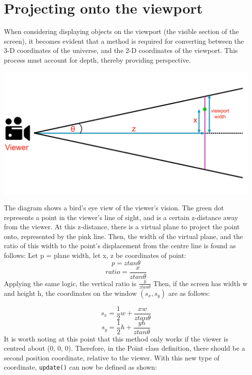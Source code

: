 \documentclass{article}
\begin{document}
\section{Projecting onto the viewport}
When considering displaying objects on the viewport (the visible section of the screen), it becomes evident that a method is required for converting between the 3-D coordinates of the universe, and the 2-D coordinates of the viewport. This process must account for depth, thereby providing perspective.

\includegraphics[width=1\textwidth]{projection_diagram.png}

The diagram shows a bird's eye view of the viewer's vision. The green dot represents a point in the viewer's line of sight, and is a certain z-distance away from the viewer. At this z-distance, there is a virtual plane to project the point onto, represented by the pink line. 
\newline
\newline
Then, the width of the virtual plane, and the ratio of this width to the point's displacement from the centre line is found as follows:
\newline
\newline
Let p = plane width, let x, z be coordinates of point:
$$ p = ztan{\theta} $$
$$ ratio = \frac{x}{ztan{\theta}} $$
Applying the same logic, the vertical ratio is $ \frac{y}{ztan{\theta}} $
\newline
\newline
Then, if the screen has width w and height h, the coordinates on the window $(s_x, s_y) $ are as follows:

$$ s_x = \frac{1}{2}w + \frac{xw}{ztan{\theta}} $$
$$ s_y = \frac{1}{2}h + \frac{yh}{ztan{\theta}} $$
\newpage
It is worth noting at this point that this method only works if the viewer is centred about (0, 0, 0). Therefore, in the Point class definition, there should be a second position coordinate, relative to the viewer. With this new type of coordinate, \verb|update()| can now be defined as shown:
\end{document}
